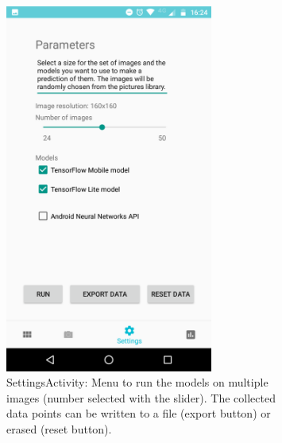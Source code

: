 \documentclass{article}
\begin{document}
\begin{figure}[]
\begin{subfigure}[p]{0.45\textwidth}
    \includegraphics[width=0.75\textwidth]{img/app/settings.png}
    \caption{\footnotesize SettingsActivity: Menu to run the models on multiple images (number selected with the slider). The collected data points can be written to a file (export button) or erased (reset button).}
    \label{fig:SettingsActivity}
  \end{subfigure}
  \quad
  \begin{subfigure}[p]{0.45\textwidth}
    \centering

\end{subfigure}
\end{figure}
\end{document}
